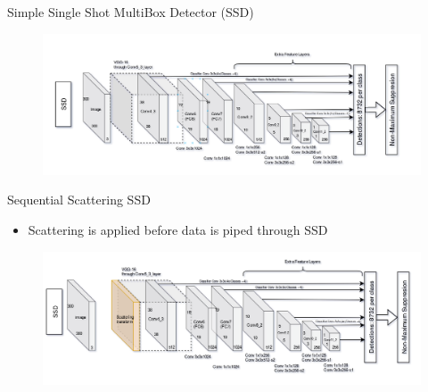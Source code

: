 \documentclass[compress]{beamer}
\begin{document}
	\subsection{ } %
	\begin{frame}{Simple Single Shot MultiBox Detector (SSD)}
		\begin{figure}
			\centering
			\includegraphics[width=\textwidth]{images/simple_ssd.png}
		\end{figure}
	\end{frame}
	\begin{frame}{Sequential Scattering SSD}
		\begin{block}{}
			\begin{itemize}
				\item Scattering is applied before data is piped through SSD
			\end{itemize}
		\end{block}
		\begin{figure}
			\centering
			\includegraphics[width=\textwidth]{images/sequential_scattering_ssd.png}
		\end{figure}
	\end{frame}
\end{document}
